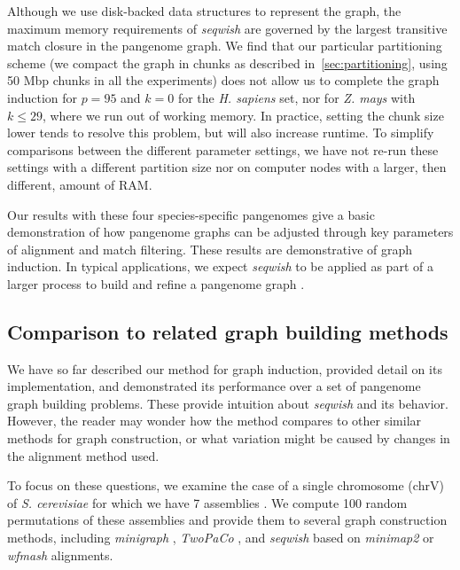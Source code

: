 \documentclass{bioinfo}
\theoremstyle{definition}
\begin{document}

Although we use disk-backed data structures to represent the graph, the maximum memory requirements of \textit{seqwish} are governed by the largest transitive match closure in the pangenome graph.
We find that our particular partitioning scheme (we compact the graph in chunks as described in~\ref{sec:partitioning}, using 50 Mbp chunks in all the experiments) does not allow us to complete the graph induction for $p=95$ and $k=0$ for the \textit{H. sapiens} set, nor for \textit{Z. mays} with $k \leq 29$, where we run out of working memory.
In practice, setting the chunk size lower tends to resolve this problem, but will also increase runtime.
To simplify comparisons between the different parameter settings, we have not re-run these settings with a different partition size nor on computer nodes with a larger, then different, amount of RAM.

Our results with these four species-specific pangenomes give a basic demonstration of how pangenome graphs can be adjusted through key parameters of alignment and match filtering.
These results are demonstrative of graph induction.
In typical applications, we expect \textit{seqwish} to be applied as part of a larger process to build and refine a pangenome graph \citep{Garrison2022_pggb,Liao_2022}.



\subsection{Comparison to related graph building methods}
\label{sec:comparison}

We have so far described our method for graph induction, provided detail on its implementation, and demonstrated its performance over a set of pangenome graph building problems.
These provide intuition about \textit{seqwish} and its behavior.
However, the reader may wonder how the method compares to other similar methods for graph construction, or what variation might be caused by changes in the alignment method used.

To focus on these questions, we examine the case of a single chromosome (chrV) of \textit{S. cerevisiae} for which we have 7 assemblies \citep{Yue_2017}.
We compute 100 random permutations \citep{Williams2009-ou} of these assemblies and provide them to several graph construction methods, including \textit{minigraph} \citep{Li:2020}, \textit{TwoPaCo} \citep{Minkin_2016}, and \textit{seqwish} based on \textit{minimap2} \citep{Li_2018} or \textit{wfmash} \citep{wfmash} alignments.
\end{document}
